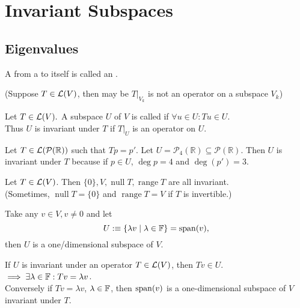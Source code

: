 \section{Invariant Subspaces}

\subsection{Eigenvalues}

\begin{mydef} [operator]
  A \lm from a \vs to itself is called an .
\end{mydef}

(Suppose $T\in \mathcal{L}(V)$, then may be $\left.T\right|_{V_{k}}$ is not an operator on a subspace $V_k$)

\begin{mydef} 
  Let $T\in \mathcal{L}(V).$ A subspace $U$ of $V$ is called  if $\forall u \in U: Tu \in U.$ \\
  Thus $U$ is invariant under $T$ if $\left.T\right|_{U}$ is an operator on $U.$
\end{mydef}

\begin{example}
  Let $T\in \mathcal{L}(\mathcal{P}(\mathbb{R}))$ such that $Tp=p'.$ Let $U=\mathcal{P}_4(\mathbb{R}) \subseteq \mathcal{P}(\mathbb{R}).$ Then $U$ is invariant under $T$
  because if $p \in U$, $\deg p = 4$ and $\deg (p')=3$.
\end{example}

\begin{example}
  Let $T\in \mathcal{L}(V)$. Then $\{0\}, V, \operatorname{null} T, \operatorname{range} T$ are all invariant. \\
  (Sometimes, $\operatorname{null} T = \{0\}$ and $\operatorname{range} T=V$ if $T$ is invertible.)
\end{example}


Take any $v\in V, v\neq 0$ and let
\begin{equation}
  U :\equiv \{  \lambda v \mid \lambda \in \mathbb{F} \} = \operatorname{span} (v),
\end{equation}
then $U$ is a one\-/dimensional subspace of $V$.

If $U$ is invariant under an operator $T \in \mathcal{L} (V)$, then $Tv  \in U$. $\implies \exists \lambda \in \mathbb{F}: Tv = \lambda v$. \\
Conversely if $Tv = \lambda v$, $\lambda \in \mathbb{F}$, then $\operatorname{span} (v)$ is a one-dimensional subspace of $V$ invariant under $T$.

